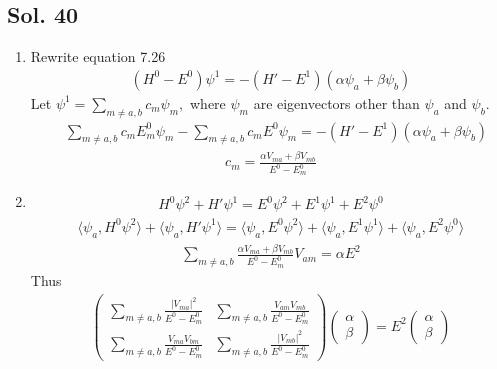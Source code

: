 \subsection*{Sol. 40}
\begin{enumerate}
    \item 
    Rewrite equation 7.26
    \begin{align*}
        (H^0-E^0)\psi^1 = -(H'-E^1)(\alpha\psi_a+\beta\psi_b)
    \end{align*}
    Let $\psi^1 =  \sum_{m\neq a,b}c_m\psi_m,$ where $\psi_m$ are eigenvectors other than $\psi_a$ and $\psi_b.$
    \begin{align*}
        &
        \sum_{m\neq a,b}c_mE_m^0\psi_m 
        -
        \sum_{m\neq a,b}c_mE^0\psi_m=-(H'-E^1)(\alpha\psi_a+\beta\psi_b)
    \end{align*}
    \begin{align*}
        c_m=\frac{\alpha V_{ma}+\beta V_{mb}}{ E^0-E_m^0}
    \end{align*}
    \item 
    \begin{align*}
        H^0\psi^2 + H'\psi^1 = E^0\psi^2 + E^1\psi^1 + E^2\psi^0
    \end{align*}
    \begin{align*}
        \langle \psi_a, H^0\psi^2\rangle +
        \langle \psi_a,H'\psi^1\rangle =
        \langle \psi_a,E^0\psi^2\rangle
        + \langle \psi_a, E^1\psi^1 \rangle+
        \langle \psi_a,E^2\psi^0\rangle
    \end{align*}
    \begin{align*}
        \sum_{m\neq a,b}
        \frac{\alpha V_{ma} + \beta V_{mb}}{E^0-E^0_m}
        V_{am}
        =\alpha E^2
    \end{align*}
    Thus 
    \begin{align*}
        \begin{pmatrix}
            \sum_{m\neq a,b}
        \frac{ |V_{ma} |^2}{E^0-E^0_m}
         & \sum_{m\neq a,b}
        \frac{V_{am}V_{mb}}{E^0-E^0_m}
        \\
        \sum_{m\neq a,b}
        \frac{V_{ma} V_{bm}}{E^0-E^0_m}
         & \sum_{m\neq a,b}
        \frac{|V_{mb}|^2}{E^0-E^0_m}
        \end{pmatrix}
        \begin{pmatrix}
            \alpha \\\beta
        \end{pmatrix}
        =E^2\begin{pmatrix}
            \alpha\\\beta
        \end{pmatrix}
    \end{align*}
    

\end{enumerate}
